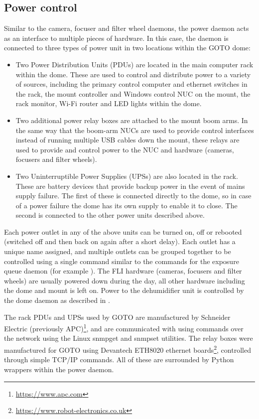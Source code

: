 \subsection{Power control}
\label{sec:power}
\begin{colsection}

Similar to the camera, focuser and filter wheel daemons, the power daemon acts as an interface to multiple pieces of hardware. In this case, the daemon is connected to three types of power unit in two locations within the GOTO dome:

\begin{itemize}
    \item Two Power Distribution Units (PDUs) are located in the main computer rack within the dome. These are used to control and distribute power to a variety of sources, including the primary control computer and ethernet switches in the rack, the mount controller and Windows control NUC on the mount, the rack monitor, Wi-Fi router and LED lights within the dome.
    \item Two additional power relay boxes are attached to the mount boom arms. In the same way that the boom-arm NUCs are used to provide control interfaces instead of running multiple USB cables down the mount, these relays are used to provide and control power to the NUC and hardware (cameras, focusers and filter wheels).
    \item Two Uninterruptible Power Supplies (UPSs) are also located in the rack. These are battery devices that provide backup power in the event of mains supply failure. The first of these is connected directly to the dome, so in case of a power failure the dome has its own supply to enable it to close. The second is connected to the other power units described above.
\end{itemize}

Each power outlet in any of the above units can be turned on, off or rebooted (switched off and then back on again after a short delay). Each outlet has a unique name assigned, and multiple outlets can be grouped together to be controlled using a single command similar to the commands for the exposure queue daemon (for example ). The FLI hardware (cameras, focusers and filter wheels) are usually powered down during the day, all other hardware including the dome and mount is left on. Power to the dehumidifier unit is controlled by the dome daemon as described in .

The rack PDUs and UPSs used by GOTO are manufactured by Schneider Electric (previously APC)\footnote{\url{https://www.apc.com}}, and are communicated with using  commands over the network using the Linux snmpget and snmpset utilities. The relay boxes were manufactured for GOTO using Devantech ETH8020 ethernet boards\footnote{\url{https://www.robot-electronics.co.uk}}, controlled through simple TCP/IP commands. All of these are surrounded by Python wrappers within the power daemon.

\end{colsection}

